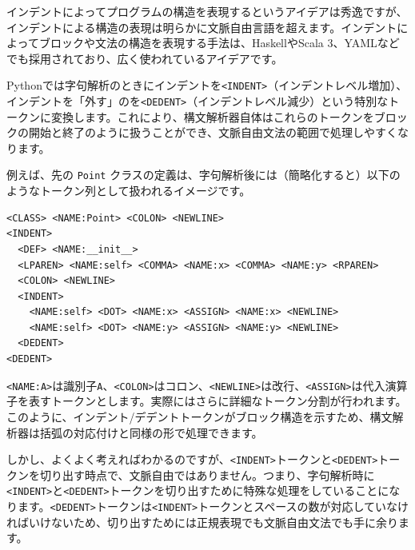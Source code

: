 インデントによってプログラムの構造を表現するというアイデアは秀逸ですが、インデントによる構造の表現は明らかに文脈自由言語を超えます。インデントによってブロックや文法の構造を表現する手法は、HaskellやScala 3、YAMLなどでも採用されており、広く使われているアイデアです。

Pythonでは字句解析のときにインデントを\texttt{\textless{}INDENT\textgreater{}}（インデントレベル増加）、インデントを「外す」のを\texttt{\textless{}DEDENT\textgreater{}}（インデントレベル減少）という特別なトークンに変換します。これにより、構文解析器自体はこれらのトークンをブロックの開始と終了のように扱うことができ、文脈自由文法の範囲で処理しやすくなります。

例えば、先の \texttt{Point}
クラスの定義は、字句解析後には（簡略化すると）以下のようなトークン列として扱われるイメージです。

\begin{verbatim}
<CLASS> <NAME:Point> <COLON> <NEWLINE>
<INDENT>
  <DEF> <NAME:__init__>
  <LPAREN> <NAME:self> <COMMA> <NAME:x> <COMMA> <NAME:y> <RPAREN>
  <COLON> <NEWLINE>
  <INDENT>
    <NAME:self> <DOT> <NAME:x> <ASSIGN> <NAME:x> <NEWLINE>
    <NAME:self> <DOT> <NAME:y> <ASSIGN> <NAME:y> <NEWLINE>
  <DEDENT>
<DEDENT>
\end{verbatim}

\texttt{\textless{}NAME:A\textgreater{}}は識別子\texttt{A}、\texttt{\textless{}COLON\textgreater{}}はコロン、\texttt{\textless{}NEWLINE\textgreater{}}は改行、\texttt{\textless{}ASSIGN\textgreater{}}は代入演算子を表すトークンとします。実際にはさらに詳細なトークン分割が行われます。このように、インデント/デデントトークンがブロック構造を示すため、構文解析器は括弧の対応付けと同様の形で処理できます。

しかし、よくよく考えればわかるのですが、\texttt{\textless{}INDENT\textgreater{}}トークンと\texttt{\textless{}DEDENT\textgreater{}}トークンを切り出す時点で、文脈自由ではありません。つまり、字句解析時に\texttt{\textless{}INDENT\textgreater{}}と\texttt{\textless{}DEDENT\textgreater{}}トークンを切り出すために特殊な処理をしていることになります。\texttt{\textless{}DEDENT\textgreater{}}トークンは\texttt{\textless{}INDENT\textgreater{}}トークンとスペースの数が対応していなければいけないため、切り出すためには正規表現でも文脈自由文法でも手に余ります。

